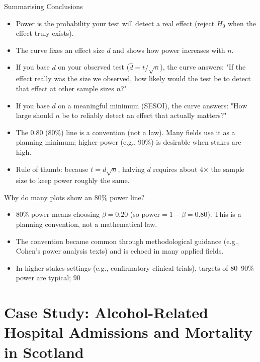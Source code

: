 \documentclass[12pt,a4paper]{article}
\begin{document}
\begin{tcolorbox}[
  enhanced,
  colback=oupred!30,          %
  frame hidden,               %
  borderline west={4pt}{0pt}{oupred} %
]
Summarising Conclusions
\begin{itemize}
\item Power is the probability your test will detect a real effect (reject $H_0$ when the effect truly exists).
\item The curve fixes an effect size $d$ and shows how power increases with $n$.
\item If you base $d$ on your observed test ($\hat d = t/\sqrt{n}$), the curve answers: "If the effect really was the size we observed, how likely would the test be to detect that effect at other sample sizes $n$?"
\item If you base $d$ on a meaningful minimum (SESOI), the curve answers: "How large should $n$ be to reliably detect an effect that actually matters?"
\item The 0.80 (80\%) line is a convention (not a law). Many fields use it as a planning minimum; higher power (e.g., 90\%) is desirable when stakes are high.
\item Rule of thumb: because $t = d\sqrt{n}$, halving $d$ requires about 4× the sample size to keep power roughly the same.
\end{itemize}

\bigskip
Why do many plots show an 80\% power line?
\begin{itemize}
\item 80\% power means choosing $\beta = 0.20$ (so $\text{power} = 1 - \beta = 0.80$). This is a planning convention, not a mathematical law.
\item The convention became common through methodological guidance (e.g., Cohen’s power analysis texts) and is echoed in many applied fields.
\item In higher-stakes settings (e.g., confirmatory clinical trials), targets of 80–90\% power are typical; 90%
\end{itemize}
\end{tcolorbox}

\newpage

\section*{Case Study: Alcohol-Related Hospital Admissions and Mortality
in
Scotland}\label{case-study-alcohol-related-hospital-admissions-and-mortality-in-scotland}
\end{document}
